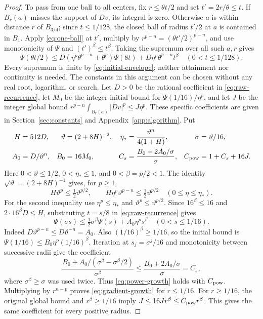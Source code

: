 \documentclass[reqno,11pt]{amsart}
\numberwithin{equation}{section}
\theoremstyle{definition}
\theoremstyle{remark}
\begin{document}
\begin{proof}
To pass from one ball to all centers, fix $r\leq\theta t/2$ and set
$t'=2r/\theta\leq t$. If $B_r(a)$ misses the support of $Dv$, its
integral is zero. Otherwise $a$ is within distance $r$ of $B_{3/4}$;
since $t\leq1/128$, the closed ball of radius $t'/2$ at $a$ is contained
in $B_1$. Apply \eqref{eq:one-ball} at $t'$, multiply by
$r^{p-n}=(\theta t'/2)^{p-n}$, and use monotonicity of $\Psi$ and
$(t')^\beta\leq t^\beta$. Taking the supremum over all such $a,r$
gives
\begin{equation}\label{eq:raw-recurrence}
 \Psi(\theta t/2)\leq
 D(\eta^p\theta^{p-n}+\theta^p)\Psi(8t)
     +D\eta^p\theta^{p-n}t^\beta
 \quad(0<t\leq1/128).
\end{equation}
Every supremum is finite by \eqref{eq:initial-envelope}; neither
attainment nor continuity is needed. The constants in this argument can be
chosen without any real root, logarithm, or search. Let $D>0$ be the rational
coefficient in \eqref{eq:raw-recurrence}, let $M_0$ be the integer initial
bound for $\Psi(1/16)/\eta^p$, and let $J$ be the integer global bound
$r^{p-n}\int_{B_r(a)}|Dv|^p\leq J\eta^p$. These specific coefficients
are given in Section~\ref{sec:constants} and Appendix~\ref{app:algorithm}.
Put
\begin{align}
 H&=512D,& \vartheta&=(2+8H)^{-2},&
 \eta_*&=\frac{\vartheta^n}{4(1+H)},& \sigma&=\vartheta/16,\label{eq:explicit-scale}\\
 A_0&=D/\vartheta^n,& B_0&=16M_0,&
 C_s&=\frac{B_0+2A_0/\sigma}{\sigma},&
 C_{\rm pow}&=1+C_s+16J.\label{eq:explicit-power}
\end{align}
Here $0<\vartheta\leq1/2$, $0<\eta_*\leq1$, and $0<\beta=p/2<1$.
The identity $\sqrt\vartheta=(2+8H)^{-1}$ gives, for $p\geq1$,
\[
 H\vartheta^p\leq\tfrac12\vartheta^{p/2},\qquad
 H\eta^p\vartheta^{p-n}\leq\tfrac12\vartheta^{p/2}
 \quad(0\leq\eta\leq\eta_*).
\]
For the second inequality use $\eta^p\leq\eta_*$ and
$\vartheta^p\leq\vartheta^{p/2}$. Since $16^\beta\leq16$ and
$2\cdot16^\beta D\leq H$, substituting $t=s/8$ in
\eqref{eq:raw-recurrence} gives
\begin{equation}\label{eq:recurrence}
 \Psi(\sigma s)\leq\tfrac12\sigma^\beta\Psi(s)
                 +A_0\eta^ps^\beta\quad(0<s\leq1/16).
\end{equation}
Indeed $D\vartheta^{p-n}\leq D\vartheta^{-n}=A_0$.
Also $(1/16)^\beta\geq1/16$, so the initial bound is
$\Psi(1/16)\leq B_0\eta^p(1/16)^\beta$.
Iteration at $s_j=\sigma^j/16$ and monotonicity between successive
radii give the coefficient
\[
 \frac{B_0+A_0/(\sigma^\beta-\sigma^\beta/2)}{\sigma^\beta}
 \leq \frac{B_0+2A_0/\sigma}{\sigma}=C_s,
\]
where $\sigma^\beta\geq\sigma$ was used twice.
Thus \eqref{eq:power-growth} holds with $C_{\rm pow}$.
Multiplying by $r^{n-p}$ proves \eqref{eq:gradient-growth} for
$r\leq1/16$. For $r\geq1/16$, the original global bound and
$r^\beta\geq1/16$ imply $J\leq16Jr^\beta\leq C_{\rm pow}r^\beta$.
This gives the same coefficient for every positive radius.
\end{proof}
\end{document}
